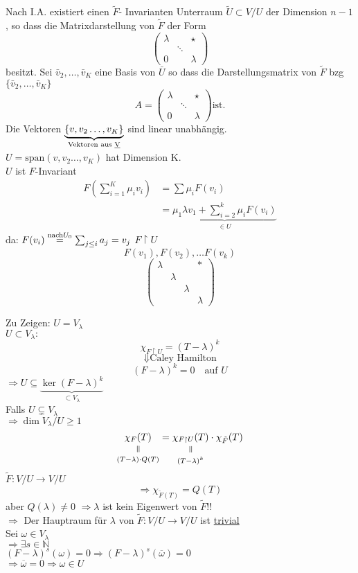 \documentclass[titlepage,12pt,a4paper,ngerman]{report}
\newcommand{\verteq}{\rotatebox{90}{$\,=$}}
\newcommand{\equalto}[2]{\underset{\scriptstyle\overset{\mkern4mu\verteq}{#2}}{#1}}
\newcommand{\tx}[1]{\textrm{#1}}
\newcommand{\ov}[1]{\overline{#1}}
\newcommand{\ub}[1]{\underbrace{#1}}
\begin{document}
Nach I.A. existiert einen $\tilde{F}$- Invarianten Unterraum $\tilde{U} \subset V / U$ der Dimension $n-1$, so dass die Matrixdarstellung von $\tilde{F}$ der Form 
$$\begin{pmatrix}
\lambda & & \star \\ & \ddots & \\ 0 & & \lambda
\end{pmatrix}$$
besitzt.
Sei $\bar{v}_2, \dots, \bar{v}_K$ eine Basis von $\bar{U}$ so dass die Darstellungsmatrix von $\tilde{F}$ bzg $\{ \bar{v}_2, \dots, \bar{v}_K \}$ 
$$A =\begin{pmatrix}
\lambda & & \star \\ & \ddots & \\ 0 & & \lambda
\end{pmatrix} \tx{ist.}$$
Die Vektoren $\underbrace{\{ v, v_2 \dots , v_K \}}_{\tx{Vektoren aus \underline{V}}}$
sind linear unabhängig.\\
$U = \tx{span} (v, v_2 \dots , v_K)$ hat Dimension K.\\

$U$ ist $F$-Invariant 
\begin{align*}
F( \sum_{i=1}^{K} \mu_i v_i) &= \sum \mu_i F(v_i) \\
&= \underbrace{\mu_1 \lambda v_1 + \sum^k_{i=2} \mu_i F(v_i) }_{\in U}
\end{align*}
da: $ F(v_i) \buildrel \tx{nach} U_0 \over = \sum_{j\le i} a_j = v_j$ 
$F \upharpoonright U$
$$F(v_1),F(v_2), \dots F(v_k)$$
$$\begin{pmatrix}
\lambda & & & *\\
& \lambda \\
& & \lambda \\
& & & \lambda
\end{pmatrix}$$

Zu Zeigen: $U = V_\lambda$\\
$U \subset V_\lambda: $\\
$$\chi_{F \upharpoonright U} = (T-\lambda)^{k}$$
$$\Downarrow \tx{Caley Hamilton}$$
$$(F-\lambda)^{k}= 0 \quad \tx{auf } U$$
$\Rightarrow U \subseteq \ub{\ker(F-\lambda)^k}_{\subset V_\lambda} $\\
Falls $ U \subsetneq V_\lambda $\\
$\Rightarrow \dim V_\lambda/ U \ge 1$
$$\equalto{\chi_F(T)}{(T-\lambda)\cdot Q(T)} = \equalto{\chi_{F \upharpoonright U}(T)}{(T-\lambda)^k} \cdot \chi_{\tilde{F}} (T)$$
$\tilde{F}: V/U \to V/U$
$$\Rightarrow \chi_{\tilde{F}(T)} = Q(T) $$
aber $ Q(\lambda) \neq 0$ 
$\Rightarrow \lambda$ ist kein Eigenwert von $ \tilde{F} $!!\\
$\Rightarrow$ Der Hauptraum für $ \lambda $ von $\tilde{F}: V/U \to V/U$ ist \underline{trivial}\\
Sei $\omega \in V_\lambda$\\
$\Rightarrow \exists s \in \mathbb{N}$\\
$(F-\lambda)^s(\omega) = 0 \Rightarrow (F -\lambda)^s(\ov{\omega}) = 0$\\
$\Rightarrow \ov{\omega} = 0 \Rightarrow \omega \in U$
\end{document}
